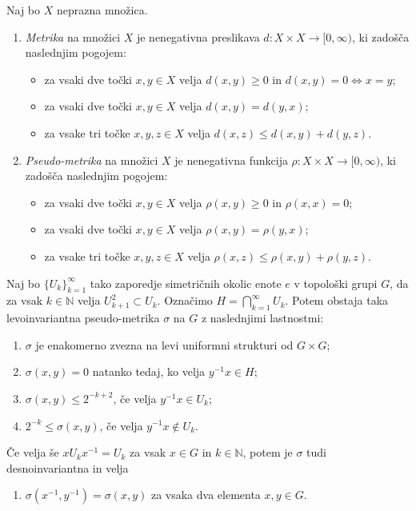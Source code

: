 \documentclass[mat1]{fmfdelo}
\newcommand{\N}{\mathbb N}
\begin{document}
\begin{definicija}\label{def:metrika}
Naj bo $X$ neprazna množica.
\begin{enumerate}
\item \emph{Metrika} na množici $X$ je nenegativna preslikava $d: X \times X \to [0,\infty)$, ki zadošča naslednjim pogojem:
\begin{itemize}
\item za vsaki dve točki $x, y \in X$ velja $d(x, y) \geq 0$ in $d(x, y) = 0 \iff x = y$;
\item za vsaki dve točki $x, y \in X$ velja $d(x, y) = d(y, x)$;
\item za vsake tri točke $x, y, z \in X$ velja $d(x, z) \leq d(x, y) + d(y, z)$.
\end{itemize}
\item \emph{Pseudo-metrika} na množici $X$ je nenegativna funkcija $\rho: X \times X \to [0,\infty)$, ki zadošča naslednjim pogojem:
\begin{itemize}
\item za vsaki dve točki $x, y \in X$ velja $\rho (x, y) \geq 0$ in $\rho (x, x) = 0$;
\item za vsaki dve točki $x, y \in X$ velja $\rho (x, y) = \rho (y, x)$;
\item za vsake tri točke $x, y, z \in X$ velja $\rho (x, z) \leq \rho (x, y) + \rho (y, z)$.
\end{itemize}
\end{enumerate}
\end{definicija}

\begin{izrek}\label{izr:pseudometrika}
Naj bo $\lbrace U_k \rbrace_{k = 1}^{\infty}$ tako zaporedje simetričnih okolic enote $e$ v topološki grupi $G$, da za vsak $k \in \N$ velja $U_{k+1}^2 \subset U_k$. Označimo $H = \bigcap_{k=1}^{\infty} U_k$. Potem obstaja taka levoinvariantna pseudo-metrika $\sigma$ na $G$ z naslednjimi lastnostmi:
\begin{enumerate}
\item $\sigma$ je enakomerno zvezna na levi uniformni strukturi od $G \times G$;
\item $\sigma (x, y) = 0$ natanko tedaj, ko velja $y^{-1}x \in H$;
\item $\sigma (x, y) \leq 2^{-k+2}$, če velja $y^{-1}x \in U_k$;
\item $2^{-k} \leq \sigma (x, y)$, če velja $y^{-1}x \notin U_k$.
\end{enumerate}

Če velja še $x U_k x^{-1} = U_k$ za vsak $x \in G$ in $k \in \N$, potem je $\sigma$ tudi desnoinvariantna in velja
\begin{enumerate}[resume]
\item $\sigma (x^{-1}, y^{-1}) = \sigma (x, y)$ za vsaka dva elementa $x, y \in G$.
\end{enumerate}
\end{izrek}
\end{document}
